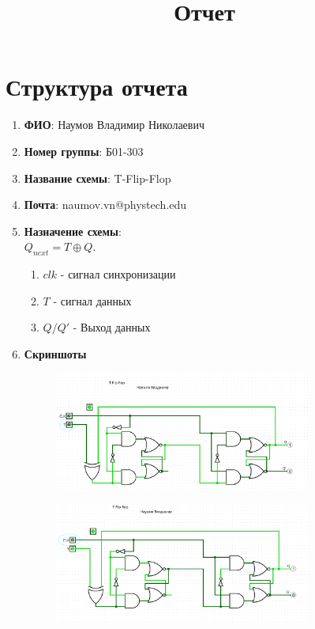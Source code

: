 \documentclass[12pt, a4paper]{article}
\title{Отчет}
\begin{document}
\maketitle

\section*{Структура отчета}

\begin{enumerate}[label=\arabic*., leftmargin=*, widest=9]
    \item \textbf{ФИО}: Наумов Владимир Николаевич
    \item \textbf{Номер группы}: Б01-303
    \item \textbf{Название схемы}: T-Flip-Flop
    \item \textbf{Почта}: naumov.vn@phystech.edu
    \item \textbf{Назначение схемы}: \\
        $Q_{next} = T \oplus Q$.
        \begin{enumerate}
            \item $clk$ - сигнал синхронизации
            \item $T$ - сигнал данных
            \item $Q/Q'$ - Выход данных
        \end{enumerate}
    
    \item \textbf{Скриншоты} \\
    \begin{figure}[H]
        \centering
        \includegraphics[width=0.8\textwidth]{state00.png}
        \label{fig:state1}
    \end{figure}
    
    \begin{figure}[H]
        \centering
        \includegraphics[width=0.8\textwidth]{state01.png}
        \label{fig:state2}
    \end{figure}
    

\end{enumerate}
\end{document}
